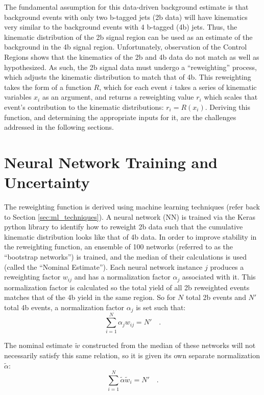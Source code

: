     The fundamental assumption for this data-driven background estimate
        is that background events with only two b-tagged jets (2b data)
        will have kinematics very similar to the background events with 4 b-tagged (4b) jets.
    Thus, the kinematic distribution of the 2b signal region can be used as an estimate of the background in the 4b signal region.
    Unfortunately, observation of the Control Regions shows that the kinematics of the 2b and 4b data do not match as well as hypothesized.
    As such, the 2b signal data must undergo a ``reweighting'' process,
        which adjusts the kinematic distribution to match that of 4b.
    This reweighting takes the form of a function $R$,
        which for each event $i$ takes a series of kinematic variables $x_i$ as an argument,
        and returns a reweighting value $r_i$ which scales that event's contribution to the kinematic distributions:
        $r_i = R(x_i)$.
    Deriving this function, and determining the appropriate inputs for it,
        are the challenges addressed in the following sections.

\FloatBarrier
\section{Neural Network Training and Uncertainty} \label{sec:nn_training}

    The reweighting function is derived using machine learning techniques (refer back to Section \ref{sec:ml_techniques}).
    A neural network (NN) is trained via the Keras python library to identify how to reweight 2b data
        such that the cumulative kinematic distribution looks like that of 4b data.
    In order to improve stability in the reweighting function,
        an ensemble of 100 networks (referred to as the ``bootstrap networks'') is trained,
        and the median of their calculations is used (called the ``Nominal Estimate'').
    Each neural network instance $j$ produces a reweighting factor $w_{ij}$ and has a normalization factor $\alpha_j$ associated with it.
    This normalization factor is calculated so the total yield of all 2b reweighted events matches that of the 4b yield in the same region. 
    So for $N$ total 2b events and $N'$ total 4b events, a normalization factor $\alpha_j$ is set such that:
        \begin{equation}
            \sum_{i=1}^{N} \alpha_j w_{ij} = N'
            \quad.
        \end{equation}

    The nominal estimate $\tilde{w}$ constructed from the median of these networks will not necessarily satisfy this same relation,
        so it is given its own separate normalization $\tilde \alpha$:
        \begin{equation}
            \sum_{i=1}^{N} \tilde \alpha \tilde w_i = N'
            \quad.
        \end{equation}

